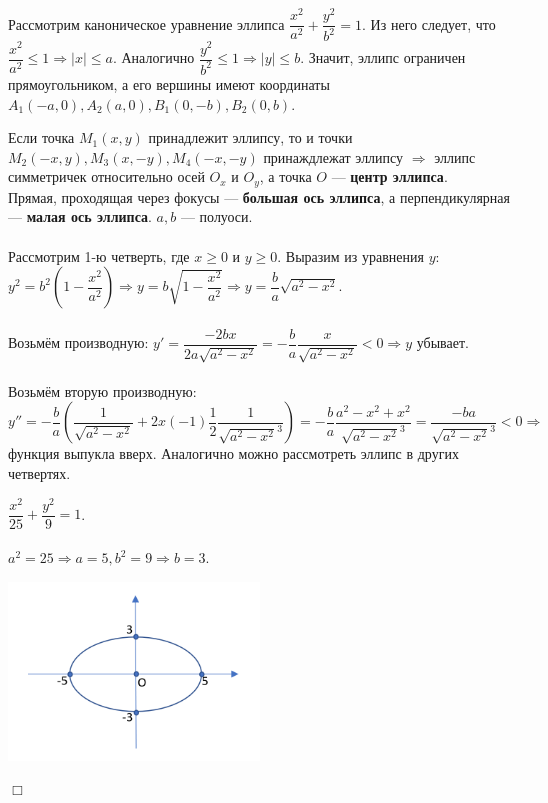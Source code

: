 \documentclass[a4paper, 12pt]{report}
\newenvironment{examp} %
{\par\noindent{\textbf{\textsc{Пример:}}}} %
{\hfill$\scriptstyle\Box$}
\begin{document}
Рассмотрим каноническое уравнение эллипса $\dfrac{x^2}{a^2} + \dfrac{y^2}{b^2} = 1$. Из него следует, что $\dfrac{x^2}{a^2} \leqslant 1 \Rightarrow |x| \leqslant a$. Аналогично $\dfrac{y^2}{b^2} \leqslant 1 \Rightarrow |y| \leqslant b$. Значит, эллипс ограничен прямоугольником, а его вершины имеют координаты $A_1(-a, 0), A_2(a, 0), B_1(0, -b), B_2(0, b)$. 

Если точка $M_1(x, y)$ принадлежит эллипсу, то и точки $M_2(-x, y), M_3(x, -y), M_4(-x, -y)$ принаждлежат эллипсу $\Rightarrow$ эллипс симметричек относительно осей $O_x$ и $O_y$, а точка $O$ --- \textbf{центр эллипса}.\\
Прямая, проходящая через фокусы --- \textbf{большая ось эллипса}, а перпендикулярная --- \textbf{малая ось эллипса}. $a, b$ --- полуоси.\\\\
Рассмотрим 1-ю четверть, где $x \geq 0$ и $y \geq 0$. Выразим из уравнения $y$: $y^2 = b^2(1 - \dfrac{x^2}{a^2}) \Rightarrow y = b\sqrt{1 - \dfrac{x^2}{a^2}} \Rightarrow y = \dfrac{b}{a}\sqrt{a^2 - x^2}$.\\\\
Возьмём производную: $y' = \dfrac{-2bx}{2a\sqrt{a^2 - x^2}} = -\dfrac{b}{a}\dfrac{x}{\sqrt{a^2 - x^2}} < 0 \Rightarrow y$ убывает.\\\\
Возьмём вторую производную: $y'' = -\dfrac{b}{a}(\dfrac{1}{\sqrt{a^2 - x^2}} + 2x(-1)\dfrac{1}{2}\dfrac{1}{\sqrt{a^2-x^2}^3}) = -\dfrac{b}{a}\dfrac{a^2 - x^2 + x^2}{\sqrt{a^2-x^2}^3} = \dfrac{-ba}{\sqrt{a^2-x^2}^3} < 0 \Rightarrow$ функция выпукла вверх. Аналогично можно рассмотреть эллипс в других четвертях.\\
\begin{examp}
$\dfrac{x^2}{25} + \dfrac{y^2}{9} = 1$. \\\\
$a^2 = 25 \Rightarrow a = 5, b^2 = 9 \Rightarrow b = 3$.
\begin{center}  
	\includegraphics[width=0.5\textwidth]{Эллипс_3.PNG}
\end{center}
\end{examp}
\end{document}
